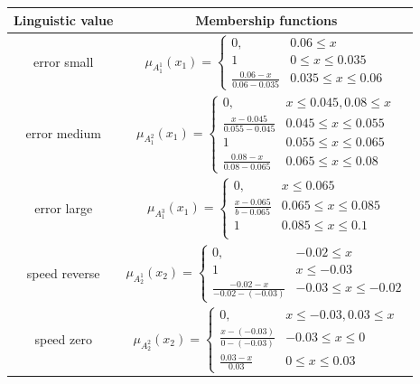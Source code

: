 \documentclass[a4paper,12pt,oneside,openright]{bhamthesis}
\begin{document}
 \begin{table}
     \begin{tabular}{|c|c|}
    
     \hline
     Linguistic value & Membership functions       \\ \hline
    
     error small   & $ \mu_{A_1^1}(x_1) = \begin{cases}
     0,  &  0.06 \leq x\\
     1  &  0  \leq x \leq 0.035  \\
     \frac{0.06-x}{0.06-0.035}  &  0.035  \leq x \leq 0.06
     \end{cases} $ \\ \hline
    
     error medium   & $ \mu_{A_1^2}(x_1) = \begin{cases}
     0,  & x \leq  0.045, 0.08 \leq x\\
     \frac{x-0.045}{0.055-0.045}  &  0.045  \leq x \leq 0.055 \\
     1  &  0.055  \leq x \leq 0.065  \\
     \frac{0.08-x}{0.08-0.065}  &  0.065  \leq x \leq 0.08
     \end{cases} $ \\ \hline
  
     error large   & $ \mu_{A_1^3}(x_1) = \begin{cases}
     0,  & x \leq  0.065 \\
     \frac{x-0.065}{b-0.065}  &  0.065  \leq x \leq 0.085 \\
     1  &  0.085  \leq x \leq 0.1  \\
     \end{cases} $ \\ \hline
    
     speed reverse   & $ \mu_{A_2^1}(x_2) = \begin{cases}
     0,  & -0.02 \leq  x \\
     1  &  x \leq -0.03  \\
     \frac{-0.02-x}{-0.02-(-0.03)}  &  -0.03  \leq x \leq -0.02
     \end{cases} $ \\ \hline
    
     speed zero   & $ \mu_{A_2^2}(x_2) = \begin{cases}
     0,  & x \leq  -0.03, 0.03 \leq x\\
     \frac{x-(-0.03)}{0-(-0.03)}  &  -0.03  \leq x \leq 0 \\
     \frac{0.03-x}{0.03}  &  0 \leq x \leq 0.03
     \end{cases} $ \\ \hline
  

\end{tabular}
\end{table}
\end{document}
